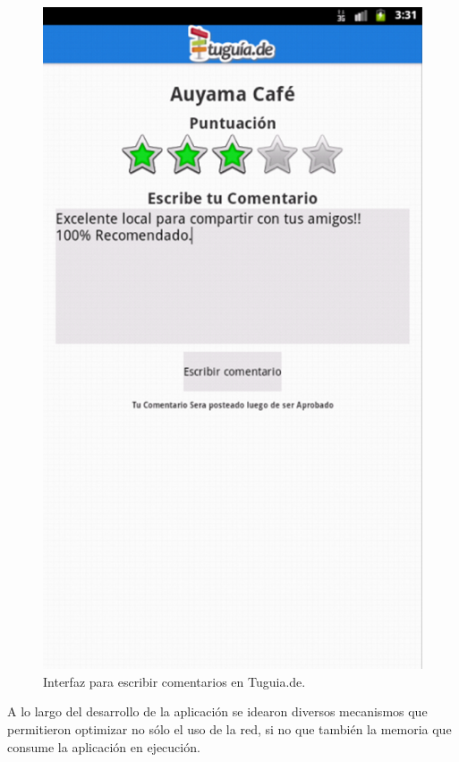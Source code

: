 \begin{figure}[h]
	\begin{center}
		\includegraphics[scale=0.4]{imagenes/escribir_coment.png}
	\end{center}
	\caption{
		\label{img:comentario}
		Interfaz para escribir comentarios en Tuguia.de.
	}
\end{figure}


A lo largo del desarrollo de la aplicación se idearon diversos mecanismos que permitieron optimizar no sólo el uso de la red, si no que también la memoria que consume la aplicación en ejecución.

